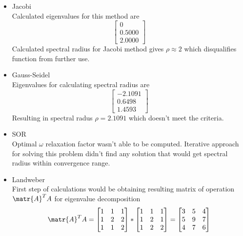 \begin{itemize}
  \item Jacobi \\
  Calculated eigenvalues for this method are 
  \begin{equation*}
    \begin{bmatrix}
      0 \\
      0.5000 \\
      2.0000
    \end{bmatrix}
  \end{equation*}
  Calculated spectral radius for Jacobi method gives $\rho \approx 2$ which disqualifies function from further use.
  \item Gauss-Seidel \\ 
  Eigenvalues for calculating spectral radius are 
  \begin{equation*}
    \begin{bmatrix}
      -2.1091 \\
      0.6498 \\
      1.4593
    \end{bmatrix}
  \end{equation*}
  Resulting in spectral radus $ \rho = 2.1091 $ which doesn't meet the criteria. 
  \item SOR \\
  Optimal $\omega$ relaxation factor wasn't able to be computed.
  Iterative approach for solving this problem didn't find any solution that would get spectral radius within convergence range.
  \item Landweber \\
  First step of calculations would be obtaining resulting matrix of operation $\matr{A}^TA$ for eigenvalue decomposition
  \begin{equation*}
    \matr{A}^TA = 
    \begin{bmatrix}
      1 & 1 & 1 \\
      1 & 2 & 2 \\
      1 & 1 & 2
      \end{bmatrix} * 
      \begin{bmatrix}
        1 & 1 & 1 \\
        1 & 2 & 1 \\
        1 & 2 & 2
      \end{bmatrix} = 
      \begin{bmatrix}
          3 & 5 & 4 \\
          5 & 9 & 7 \\
          4 & 7 & 6
      \end{bmatrix}

\end{equation*}
\end{itemize}
